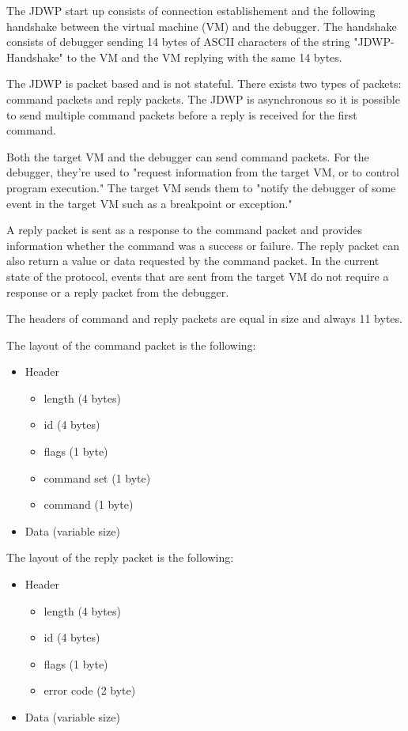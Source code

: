 \documentclass[..thesis.tex]{subfiles}
\begin{document}
The JDWP start up consists of connection establishement and the following handshake between the virtual machine (VM) and the debugger.
The handshake consists of debugger sending 14 bytes of ASCII characters of the string "JDWP-Handshake" to the VM and the VM replying with the same 14 bytes.\cite{oracle_jdwp_spec}

The JDWP is packet based and is not stateful. There exists two types of packets: command packets and reply packets.
The JDWP is asynchronous so it is possible to send multiple command packets before a reply is received for the first command.

Both the target VM and the debugger can send command packets. For the debugger, they're used to "request information from the target VM, or to control program execution."
The target VM sends them to "notify the debugger of some event in the target VM such as a breakpoint or exception."\cite{oracle_jdwp_spec}

A reply packet is sent as a response to the command packet and provides information whether the command was a success or failure. The reply packet can also return a value or data requested by the command packet. In the current state of the protocol, events that are sent from the target VM do not require a response or a reply packet from the debugger.\cite{oracle_jdwp_spec}

The headers of command and reply packets are equal in size and always 11 bytes. 

The layout of the command packet is the following:
\begin{itemize}[nosep]
  \item Header
    \begin{itemize}[nosep]
      \item length (4 bytes)
      \item id (4 bytes)
      \item flags (1 byte)
      \item command set (1 byte)
      \item command (1 byte)
    \end{itemize}
  \item Data (variable size) 
\end{itemize}

The layout of the reply packet is the following:
\begin{itemize}[nosep]
  \item Header
    \begin{itemize}[nosep]
      \item length (4 bytes)
      \item id (4 bytes)
      \item flags (1 byte)
      \item error code (2 byte)
    \end{itemize}
  \item Data (variable size) 
\end{itemize}
\end{document}
